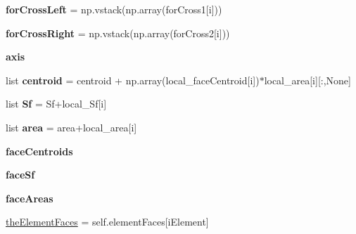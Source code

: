 \begin{DoxyCompactItemize}
{\bfseries for\+Cross\+Left} = np.\+vstack(np.\+array(for\+Cross1\mbox{[}i\mbox{]}))
\item 
\mbox{\label{classpy_f_v_m_1_1_polymesh_1_1_polymesh_a4391b40132bd2fda0790dd5b690f5024}} 
{\bfseries for\+Cross\+Right} = np.\+vstack(np.\+array(for\+Cross2\mbox{[}i\mbox{]}))
\item 
\mbox{\label{classpy_f_v_m_1_1_polymesh_1_1_polymesh_a7a7be6e09d6f53fc4b492622b5ba7d8b}} 
{\bfseries axis}
\item 
\mbox{\label{classpy_f_v_m_1_1_polymesh_1_1_polymesh_a6b26a055493f9f24dd3122618395914f}} 
list {\bfseries centroid} = centroid + np.\+array(local\+\_\+face\+Centroid\mbox{[}i\mbox{]})$\ast$local\+\_\+area\mbox{[}i\mbox{]}\mbox{[}\+:,None\mbox{]}
\item 
\mbox{\label{classpy_f_v_m_1_1_polymesh_1_1_polymesh_a26903f43f335d14e12aebcbd16bb82df}} 
list {\bfseries Sf} = Sf+local\+\_\+\+Sf\mbox{[}i\mbox{]}
\item 
\mbox{\label{classpy_f_v_m_1_1_polymesh_1_1_polymesh_aa3af284e489098586a1a260ca80c5417}} 
list {\bfseries area} = area+local\+\_\+area\mbox{[}i\mbox{]}
\item 
\mbox{\label{classpy_f_v_m_1_1_polymesh_1_1_polymesh_a08da87db3be99c20a03e4901b305cb79}} 
{\bfseries face\+Centroids}
\item 
\mbox{\label{classpy_f_v_m_1_1_polymesh_1_1_polymesh_a8a932b5b79eccdb5c664e53b8cdfd705}} 
{\bfseries face\+Sf}
\item 
\mbox{\label{classpy_f_v_m_1_1_polymesh_1_1_polymesh_abf238c9613a86e0759fd4a2fa056c55d}} 
{\bfseries face\+Areas}
\item 
\mbox{\hyperlink{classpy_f_v_m_1_1_polymesh_1_1_polymesh_a78aa9d2d0f23abfe2c8a5a1b276c07bd}{the\+Element\+Faces}} = self.\+element\+Faces\mbox{[}i\+Element\mbox{]}
\item 
\mbox{\label{classpy_f_v_m_1_1_polymesh_1_1_polymesh_a0fa962158191f3c0b99a87055e7da02c}} 

\end{DoxyCompactItemize}

